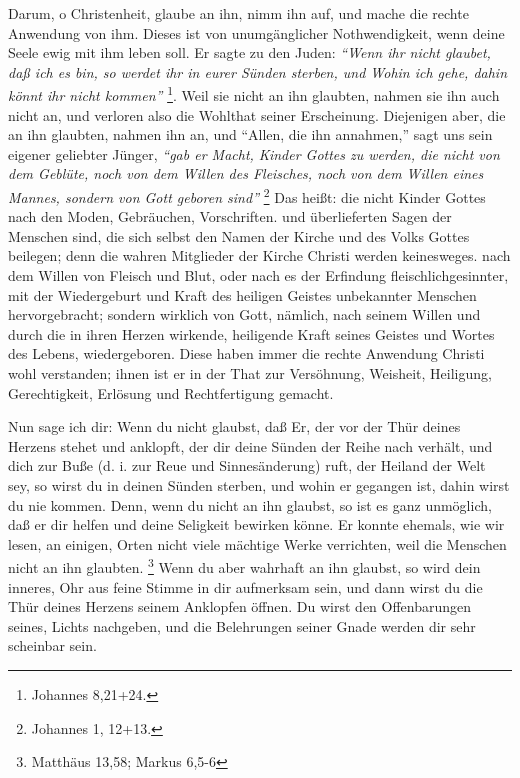 Darum, o Christenheit, glaube an ihn, nimm ihn auf, und mache die rechte
Anwendung von ihm. Dieses ist von unumgänglicher Nothwendigkeit, wenn deine
Seele ewig mit ihm leben soll.
Er sagte zu den Juden:
\textit{"`Wenn ihr nicht glaubet, daß ich es bin, so werdet ihr in eurer Sünden
sterben, und Wohin ich gehe, dahin könnt ihr nicht kommen"'}
\footnote{Johannes 8,21+24.}.
 Weil sie nicht an ihn 
glaubten, nahmen sie ihn auch nicht an, und verloren also die Wohlthat seiner
Erscheinung. Diejenigen aber, die an ihn glaubten, nahmen ihn an, und "`Allen,
die ihn annahmen,"' sagt uns sein eigener geliebter Jünger,
\textit{"`gab er Macht, Kinder Gottes zu werden, die nicht von dem Geblüte, noch
von dem Willen des Fleisches, noch von dem Willen eines Mannes, sondern von Gott
geboren sind"'}
\footnote{Johannes 1, 12+13.}
Das heißt: die nicht Kinder Gottes nach den
Moden, Gebräuchen, Vorschriften. und überlieferten Sagen der Menschen sind, die
sich selbst den Namen der Kirche und des Volks Gottes beilegen; denn die wahren
Mitglieder der Kirche Christi werden keinesweges. nach dem Willen von Fleisch
und Blut, oder nach es der Erfindung fleischlichgesinnter, mit der Wiedergeburt
und Kraft des heiligen Geistes unbekannter Menschen hervorgebracht; sondern
wirklich von Gott, nämlich, nach seinem Willen und  durch die in ihren Herzen
wirkende, heiligende Kraft seines Geistes und Wortes des Lebens, wiedergeboren.
Diese haben immer die rechte Anwendung Christi wohl verstanden; ihnen ist er in
der That zur Versöhnung, Weisheit, Heiligung, Gerechtigkeit, Erlösung und
Rechtfertigung gemacht.

Nun sage ich dir: Wenn du nicht glaubst, daß Er, der vor der Thür deines Herzens
stehet und anklopft, der dir deine Sünden der Reihe nach verhält, und dich zur
Buße (d. i. zur Reue und Sinnesänderung) ruft, der Heiland der Welt sey, so
wirst du in deinen Sünden sterben, und wohin er gegangen ist, dahin wirst du nie
kommen. Denn, wenn du nicht an ihn glaubst, so ist es ganz unmöglich, daß er dir
helfen und deine Seligkeit bewirken könne. Er konnte ehemals, wie wir lesen, an
einigen, Orten nicht viele mächtige Werke verrichten, weil die Menschen nicht an
ihn glaubten.
\footnote{Matthäus 13,58; Markus 6,5-6}
Wenn du aber wahrhaft an ihn
glaubst, so wird dein inneres, Ohr aus feine Stimme in dir aufmerksam sein, und
dann wirst du die Thür deines Herzens seinem Anklopfen öffnen. Du wirst den
Offenbarungen seines, Lichts nachgeben, und die Belehrungen seiner Gnade werden
dir sehr scheinbar sein.

